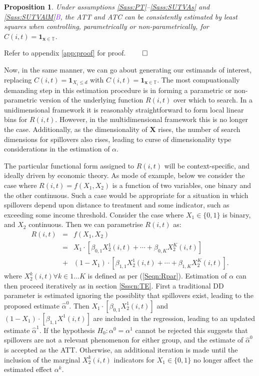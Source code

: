 \documentclass[12pt]{article}
\newtheorem{proposition}{Proposition}
\newcommand{\asref}[2]{\ref{#1}{\textcolor{BlueViolet}{#2}}}
\begin{document}
\begin{spacing}{1.3}
\begin{proposition}
\label{Pass:ATTnonP}
Under assumptions \ref{Sass:PT}--\ref{Sass:SUTVAs} and \asref{Sass:SUTVAlM}{B}, 
the ATT and ATC can be consistently estimated by least squares when controlling, 
parametrically or non-parametrically, for $C(i,t)=\mathbf{1}_{\mathbf{x}\in
\mathbb{T}}$. 
\end{proposition}
\noindent Refer to appendix \ref{app:proof} for proof. $\qed$

Now, in the same manner, we can go about generating our estimands of interest, 
replacing $C(i,t)=\mathbf{1}_{X_i\leq d}$ with $C(i,t)=\mathbf{1}_{\mathbf{x}\in 
\mathbb{T}}$. The most compuationally demanding step in this estimation procedure 
is in forming a parametric or non-parametric version of the underlying function 
$R(i,t)$ over which to search.  In a unidimensional framework it is reasonably 
straightforward to form local linear bins for $R(i,t)$.  However, in the 
multidimensional framework this is no longer the case.  Additionally, as the 
dimensionality of $\mathbf{X}$ rises, the number of search dimensions for 
spillovers also rises, leading to curse of dimensionality type considerations in 
the estimation of $\alpha$.

The particular functional form assigned to $R(i,t)$ will be context-specific,
and ideally driven by economic theory.  As mode of example, below we consider the
case where $R(i,t)=f(X_1,X_2)$ is a function of two variables, one binary and
the other continuous.  Such a case would be appropriate for a situation in which
spillovers depend upon distance to treatment and some indicator, such as exceeding
some income threshold.  Consider the case where $X_1\in \{0,1\}$ is binary, and 
$X_2$ continuous.  Then we can parametrise $R(i,t)$ as:
\begin{eqnarray}
R(i,t)&=&f(X_1,X_2) \nonumber \\
      &=&X_1\cdot[\beta_{0,1}X_2^1(i,t)+ \cdots + \beta_{0,K}X_2^K(i,t)] \nonumber \\
      &+& (1-X_1)\cdot[\beta_{1,1}X_2^1(i,t)+ \cdots + \beta_{1,K}X_2^K(i,t)]. \nonumber
\end{eqnarray}
where $X_2^k(i,t) \forall k \in 1\ldots K$ is defined as per (\ref{Seqn:Rpar}).  
Estimation of $\alpha$ 
can then proceed iteratively as in section \ref{Ssscn:TE}.  First a traditional 
DD parameter is estimated ignoring the possiblity that spillovers exist, leading 
to the proposed estimate $\hat\alpha^0$.  Then $X_1\cdot[\beta_{0,1}X_2^1(i,t)]$ 
and $(1-X_1)\cdot[\beta_{1,1}X^1(i,t)]$ are included in the regression, leading to 
an updated estimate $\hat\alpha^1$.  If the hypothesis $H_0: \alpha^0=\alpha^1$ 
cannot be rejected this suggests that spillovers are not a relevant phenomenon 
for either group, and the estimate of $\hat\alpha^0$ is accepted as the ATT.  
Otherwise, an additional iteration is made until the inclusion of the marginal 
$X_2^k(i,t)$ indicators for $X_1 \in \{0,1\}$ no longer affect the estimated 
effect $\alpha^k$.



\end{spacing}
\end{document}
